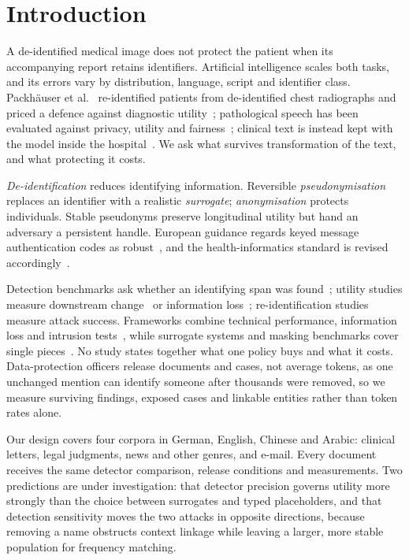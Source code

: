 \section{Introduction}\label{sec:introduction}

A de-identified medical image does not protect the patient when its accompanying report retains identifiers. Artificial
intelligence scales both tasks, and its errors vary by distribution, language, script and identifier
class. Packh\"auser et al.~\cite{packhauser2022reid} re-identified patients from de-identified chest
radiographs and priced a defence against diagnostic utility~\cite{packhauser2023anonymization};
pathological speech has been evaluated against privacy, utility and
fairness~\cite{arasteh2024speaker}; clinical text is instead kept with the model inside the
hospital~\cite{hou2025llama}. We ask what survives transformation of the text, and what protecting
it costs.

\emph{De-identification} reduces identifying information. Reversible \emph{pseudonymisation}
replaces an identifier with a realistic \emph{surrogate}; \emph{anonymisation} protects individuals. 
Stable pseudonyms preserve longitudinal utility but hand an adversary a persistent handle.
European guidance regards keyed message authentication codes as
robust~\cite{enisa2021pseudonymisation}, and the health-informatics standard is revised
accordingly~\cite{din25237}.

Detection benchmarks ask whether an identifying span was
found~\cite{vats2026redact,jha2026piibench,uppala2026privacyfilter}; utility studies measure
downstream change~\cite{vakili2022utility,berg2020impact} or information
loss~\cite{trienes2024infolossqa}; re-identification studies measure attack success. Frameworks
combine technical performance, information loss and intrusion tests~\cite{mozes2021nointruder},
while surrogate systems and masking benchmarks cover single
pieces~\cite{eder2019emails,pilan2022tab,osborne2022bratsynthetic}. No study states together what one
policy buys and what it costs. Data-protection officers release documents and cases, not average
tokens, as one unchanged mention can identify someone after thousands were removed, so we measure
surviving findings, exposed cases and linkable entities rather than token rates alone.

Our design covers four corpora in German, English, Chinese and Arabic: clinical letters, legal
judgments, news and other genres, and e-mail. Every document receives the same detector comparison,
release conditions and measurements. Two predictions are under investigation: that detector precision
governs utility more strongly than the choice between surrogates and typed placeholders, and that
detection sensitivity moves the two attacks in opposite directions, because removing a name obstructs
context linkage while leaving a larger, more stable population for frequency matching. 
